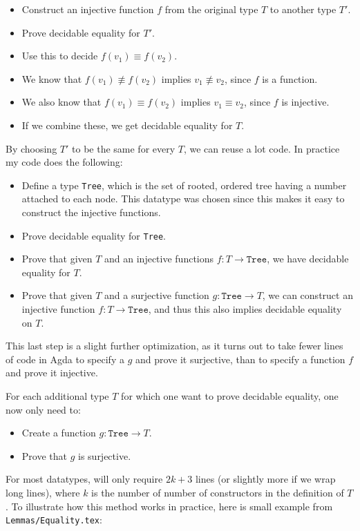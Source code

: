 \begin{itemize}
\item Construct an injective function $f$ from the original type $T$ to another
  type $T'$.
\item Prove decidable equality for $T'$.
\item Use this to decide $f(v_1) \equiv f(v_2)$.
\item We know that $f(v_1) \not\equiv f(v_2)$ implies $v_1 \not\equiv v_2$,
  since $f$ is a function.
\item We also know that $f(v_1) \equiv f(v_2)$ implies $v_1 \equiv v_2$, since
  $f$ is injective.
\item If we combine these, we get decidable equality for $T$.
\end{itemize}

By choosing $T'$ to be the same for every $T$, we can reuse a lot code. In
practice my code does the following:

\begin{itemize}
\item Define a type \texttt{Tree}, which is the set of rooted, ordered tree
  having a number attached to each node. This datatype was chosen since this
  makes it easy to construct the injective functions.
\item Prove decidable equality for \texttt{Tree}.
\item Prove that given $T$ and an injective functions $f : T \to \mathtt{Tree}$,
  we have decidable equality for $T$.
\item Prove that given $T$ and a surjective function $g : \mathtt{Tree} \to T$,
  we can construct an injective function $f : T \to \mathtt{Tree}$, and thus
  this also implies decidable equality on $T$.
\end{itemize}

This last step is a slight further optimization, as it turns out to take fewer
lines of code in Agda to specify a $g$ and prove it surjective, than to specify
a function $f$ and prove it injective.

For each additional type $T$ for which one want to prove decidable equality, one
now only need to:

\begin{itemize}
\item Create a function $g : \mathtt{Tree} \to T$.
\item Prove that $g$ is surjective.
\end{itemize}

For most datatypes, will only require $2k+3$ lines (or slightly more if we wrap
long lines), where $k$ is the number of number of constructors in the definition
of $T$. To illustrate how this method works in practice, here is small example
from \texttt{Lemmas/Equality.tex}:

